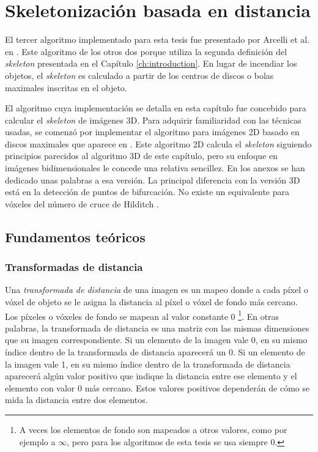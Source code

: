 \chapter{Skeletonización basada en distancia}
\label{ch:arcelli}

El tercer algoritmo implementado para esta tesis fue presentado por Arcelli et al. en \cite{arcelli2011distance}. Este algoritmo  de los otros dos porque utiliza la segunda definición del \textit{skeleton} presentada en el Capítulo \ref{ch:introduction}. En lugar de incendiar los objetos, el \textit{skeleton} es calculado a partir de los centros de discos o bolas maximales inscritas en el objeto.

El algoritmo cuya implementación se detalla en esta capítulo fue concebido para calcular el \textit{skeleton} de imágenes 3D. Para adquirir familiaridad con las técnicas usadas, se comenzó por implementar el algoritmo para imágenes 2D basado en discos maximales que aparece en \cite{di1996skeletonization}. Este algoritmo 2D calcula el \textit{skeleton} siguiendo principios parecidos al algoritmo 3D de este capítulo, pero su enfoque en imágenes bidimensionales le concede una relativa sencillez. En los anexos se han dedicado unas palabras a esa versión. La principal diferencia con la versión 3D está en la detección de puntos de bifurcación. No existe un equivalente para vóxeles del número de cruce de Hilditch \cite{hilitch1969linear}.

\section{Fundamentos teóricos}

\subsection{Transformadas de distancia}

Una \textit{transformada de distancia} de una imagen es un mapeo donde a cada píxel o vóxel de objeto se le asigna la distancia al píxel o vóxel de fondo más cercano. Los píxeles o vóxeles de fondo se mapean al valor constante 0 \footnote{A veces los elementos de fondo son mapeados a otros valores, como por ejemplo a $\infty$, pero para los algoritmos de esta tesis se usa siempre 0.}. En otras palabras, la transformada de distancia es una matriz con las mismas dimensiones que su imagen correspondiente. Si un elemento de la imagen vale 0, en su mismo índice dentro de la transformada de distancia aparecerá un 0. Si un elemento de la imagen vale 1, en su mismo índice dentro de la transformada de distancia aparecerá algún valor positivo que indique la distancia entre ese elemento y el elemento con valor 0 más cercano. Estos valores positivos dependerán de cómo se mida la distancia entre dos elementos.

